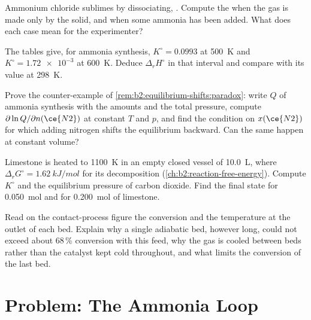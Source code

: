 \begin{exercise}[$\star\star$]\label{exo:b2:equilibrium-shifts:8}
Ammonium chloride sublimes by dissociating, . Compute the  when the gas is made only by the solid, and when
some ammonia has been added. What does each case mean for the experimenter?
\end{exercise}

\begin{exercise}[$\star\star$]\label{exo:b2:equilibrium-shifts:9}
The tables give, for ammonia synthesis, $K^\circ = 0.0993$ at \qty{500}{K} and
$K^\circ = \num{1.72e-3}$ at \qty{600}{K}. Deduce $\Delta_r H^\circ$ in that
interval and compare with its value at \qty{298}{K}.
\end{exercise}

\begin{exercise}[$\star\star\star$]\label{exo:b2:equilibrium-shifts:10}
Prove the counter-example of \cref{rem:b2:equilibrium-shifts:paradox}: write
$Q$ of ammonia synthesis with the amounts and the total pressure, compute
$\partial\ln Q/\partial n(\ce{N2})$ at constant $T$ and $p$, and find the
condition on $x(\ce{N2})$ for which adding nitrogen shifts the equilibrium
backward. Can the same happen at constant volume?
\end{exercise}

\begin{exercise}[$\star\star\star$]\label{exo:b2:equilibrium-shifts:11}
Limestone is heated to \qty{1100}{K} in an empty closed vessel of
\qty{10.0}{L}, where $\Delta_r G^\circ = \qty{1.62}{kJ/mol}$ for its
decomposition (\cref{ch:b2:reaction-free-energy}). Compute $K^\circ$ and the
equilibrium pressure of carbon dioxide. Find the final state for
\qty{0.050}{mol} and for \qty{0.200}{mol} of limestone.
\end{exercise}

\begin{exercise}[$\star\star\star$]\label{exo:b2:equilibrium-shifts:12}
Read on the contact-process figure the conversion and the temperature at the
outlet of each bed. Explain why a single adiabatic bed, however long, could
not exceed about 68\,\% conversion with this feed, why the gas is cooled
between beds rather than the catalyst kept cold throughout, and what limits
the conversion of the last bed.
\end{exercise}

\section{Problem: The Ammonia Loop}

